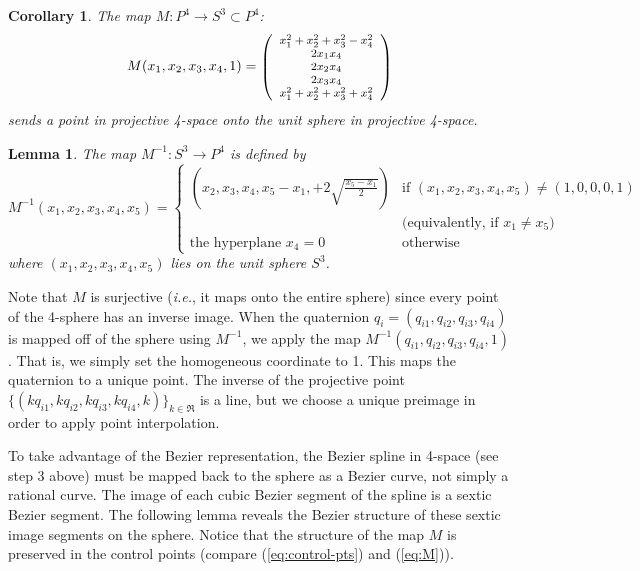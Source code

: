 \documentclass[times]{article}
\newtheorem{lemma}{Lemma}[section]
\newtheorem{corollary}{Corollary}[section]
\begin{document}
\begin{corollary}
The map 
$M:P^4 \rightarrow S^3 \subset P^4$:
\begin{equation}
\label{eq:M}
	M(x_1,x_2,x_3,x_4,1) = \mbox{\footnotesize{$\left( \begin{array}{c}
		x_1^2+x_2^2+x_3^2-x_4^2 \\
		2x_1x_4 \\
		2x_2x_4 \\
		2x_3x_4 \\
		x_1^2+x_2^2+x_3^2+x_4^2
		\end{array} \right)$}}
\end{equation}
sends a point in projective 4-space onto the unit sphere in projective
4-space.
\end{corollary}

\begin{lemma}
\label{lem:invM}
The map $M^{-1}:S^3 \rightarrow P^4$ is defined by
\begin{equation}
\label{eq:invM}
M^{-1}(x_1,x_2,x_3,x_4,x_5)=
\left\{ \begin{array}{ll}
(x_2,x_3,x_4,x_5-x_1,+2\sqrt{\frac{x_5-x_1}{2}}) 
	& \mbox{if } (x_1,x_2,x_3,x_4,x_5) \neq (1,0,0,0,1) \\
	& \mbox{(equivalently, if } x_1 \neq x_5 \mbox{)} \\
\mbox{the hyperplane } x_4 = 0 
	& \mbox{otherwise}
\end{array} \right.
\end{equation}
where $(x_1,x_2,x_3,x_4,x_5)$ lies on the unit sphere $S^3$.
\end{lemma}

Note that $M$ is surjective ({\em i.e.}, it maps onto the entire sphere)
since every point of the 4-sphere has an inverse image.
When the quaternion $q_i = (q_{i1},q_{i2},q_{i3},q_{i4})$ is mapped off
of the sphere using $M^{-1}$,
we apply the map $M^{-1}(q_{i1},q_{i2},q_{i3},q_{i4},1)$.
That is, we simply set the homogeneous coordinate to 1.
This maps the quaternion to a unique point.
The inverse of the projective point 
$\{(kq_{i1},kq_{i2},kq_{i3},kq_{i4},k)\}_{k \in \Re}$
is a line,
but we choose a unique preimage in order to apply point interpolation.

To take advantage of the Bezier representation,
the Bezier spline in 4-space (see step 3 above)
must be mapped back to the sphere
as a Bezier curve, not simply a rational curve.
The image of each cubic Bezier segment of the spline is a sextic Bezier segment.
The following lemma reveals the Bezier structure of these sextic
image segments on the sphere.
Notice that the structure of the map $M$ is preserved in the control
points (compare (\ref{eq:control-pts}) and (\ref{eq:M})).
\end{document}
